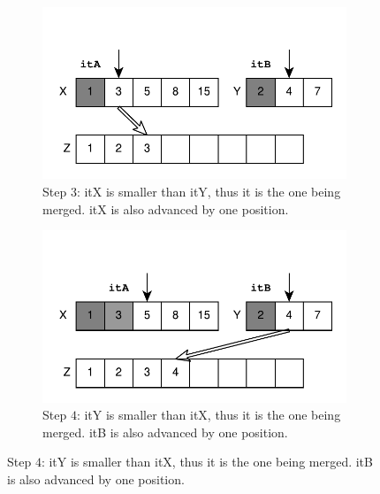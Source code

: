 \begin{figure}
	\begin{subfigure}[b]{0.45\textwidth}
		\centering
		\includegraphics[trim=0 0 0 45,clip,width=\textwidth]{sources/median_sorted_arrays/images/mergearrays2}
		\caption{Step $3$: itX is smaller than itY, thus it is the one being merged. itX is also advanced by one position.}
		\label{fig:median_sorted_array:mergearray2}
	\end{subfigure}
	\hfill
	\begin{subfigure}[b]{0.45\textwidth}
		\centering
		\includegraphics[trim=0 0 0 45,clip,width=\textwidth]{sources/median_sorted_arrays/images/mergearrays3}
		\caption{Step $4$: itY is smaller than itX, thus it is the one being merged. itB is also advanced by one position. }
		\label{fig:median_sorted_array:mergearray3}
	\end{subfigure}
	\hfill


\end{figure}
